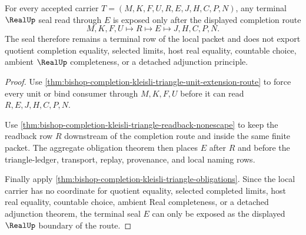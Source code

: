 \begin{theorem}
\label{thm:bishop-completion-kleisli-triangle-real-seal-boundary}
For every accepted carrier $T=(M,K,F,U,R,E,J,H,C,P,N)$, any terminal $\RealUp$ seal read through $E$ is exposed only after the displayed completion route
$$
M,K,F,U \longmapsto R \longmapsto E \longmapsto J,H,C,P,N .
$$
The seal therefore remains a terminal row of the local packet and does not export quotient completion equality, selected limits, host real equality, countable choice, ambient $\RealUp$ completeness, or a detached adjunction principle.
\end{theorem}
\begin{proof}
Use \autoref{thm:bishop-completion-kleisli-triangle-unit-extension-route} to force every unit or bind consumer through $M,K,F,U$ before it can read $R,E,J,H,C,P,N$.

Use \autoref{thm:bishop-completion-kleisli-triangle-readback-nonescape} to keep the readback row $R$ downstream of the completion route and inside the same finite packet. The aggregate obligation theorem then places $E$ after $R$ and before the triangle-ledger, transport, replay, provenance, and local naming rows.

Finally apply \autoref{thm:bishop-completion-kleisli-triangle-obligations}. Since the local carrier has no coordinate for quotient equality, selected completed limits, host real equality, countable choice, ambient Real completeness, or a detached adjunction theorem, the terminal seal $E$ can only be exposed as the displayed $\RealUp$ boundary of the route.
\end{proof}

\begin{closurestatus}{\BishopCompletionKleisliTriangleUp}
  \theoryclosure{\seedClosure}
  \formalstatus{\unformalizedV}
\end{closurestatus}
